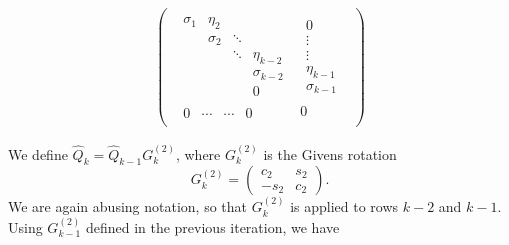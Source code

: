 \documentclass[11pt]{article}
\newcommand{\hQ}{\hat{Q}}
\begin{document}
\begin{eqnarray*}
\begin{pmatrix}\begin{array}{c|c}
\begin{matrix}
 \sigma_1    & \eta_2 &         &      \\
            & \sigma_2   & \ddots  &      \\
            &          & \ddots  & \eta_{k-2}     \\
            &          &         & \sigma_{k-2} \\
		        &          &         & 0 
 \end{matrix}
&  \begin{matrix} 0 \\ \vdots \\ \vdots \\ \eta_{k-1} \\ \sigma_{k-1} \end{matrix} \\
\hline
\begin{matrix} 0 & \cdots  & \cdots & 0  \end{matrix} & 0
\end{array}\end{pmatrix}
\end{eqnarray*}

We define $\hQ_k = \hQ_{k-1}G^{(2)}_k$, where $G^{(2)}_k$ is the Givens rotation
$$G^{(2)}_k = \begin{pmatrix}
c_2 & s_2 \\
-s_2 & c_2
\end{pmatrix}. $$
We are again abusing notation, so that $G_k^{(2)}$ is applied to rows $k-2$ and $k-1$.
Using $G^{(2)}_{k-1}$ defined in the previous iteration, we have
\end{document}
